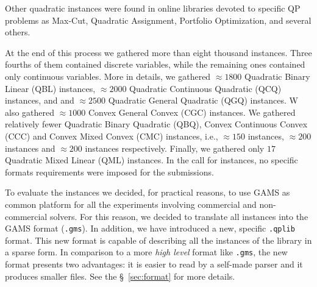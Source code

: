 Other quadratic instances were found in online libraries devoted to
specific QP problems as Max-Cut, Quadratic Assignment, Portfolio
Optimization, and several others.

At the end of this process we gathered more than eight thousand
instances. Three fourths of them contained discrete variables, while
the remaining ones contained only continuous variables. More in details,
we gathered $\approx 1800$ Quadratic Binary Linear (QBL) instances,
$\approx 2000$ Quadratic Continuous Quadratic (QCQ) instances, and
and $\approx 2500$ Quadratic General Quadratic (QGQ) instances. W
also gathered $\approx 1000$ Convex General Convex (CGC) instances. We
gathered relatively fewer Quadratic Binary Quadratic (QBQ), Convex
Continuous Convex (CCC) and Convex Mixed Convex (CMC) instances, i.e.,
$\approx 150$ instances, $\approx 200$ instances and $\approx 200$
instances respectively. Finally, we gathered only $17$ Quadratic Mixed
Linear (QML) instances. In the call for instances, no specific formats
requirements were imposed for the submissions.

To evaluate the instances we decided, for practical reasons, to use
GAMS as common platform for all the experiments involving commercial and
non-commercial solvers. For this reason, we decided to translate all
instances into the GAMS format (\texttt{.gms}). 
%
In addition, we have introduced a new, specific \texttt{.qplib} format. This
new format is capable of describing all the instances of the library in a sparse form.
In comparison to a more \emph{high level} format like \texttt{.gms}, the new
format presents two advantages: it is easier to read by a self-made parser and
it produces smaller files. See the \S~\ref{sec:format} for more details.


